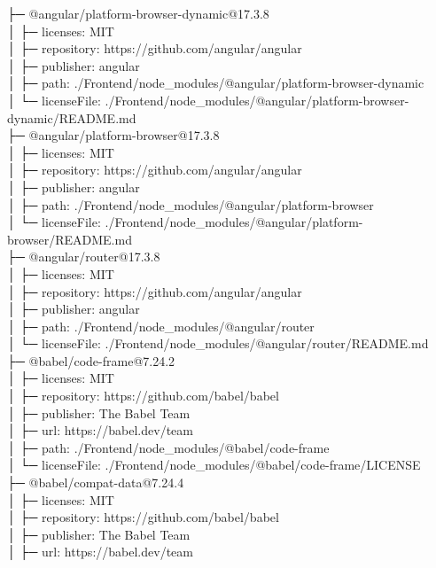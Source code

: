 \documentclass[
    paper=a4,
    twoside=false,
    parskip=half,
    listof=entryprefix,
    listof=totoc,
    index=totoc,
    bibliography=totoc,
    headsepline,
]{scrbook}
\begin{document}
    ├─ @angular/platform-browser-dynamic@17.3.8\\
    │  ├─ licenses: MIT\\
    │  ├─ repository: https://github.com/angular/angular\\
    │  ├─ publisher: angular\\
    │  ├─ path: ./Frontend/node\_modules/@angular/platform-browser-dynamic\\
    │  └─ licenseFile: ./Frontend/node\_modules/@angular/platform-browser-dynamic/README.md\\
    ├─ @angular/platform-browser@17.3.8\\
    │  ├─ licenses: MIT\\
    │  ├─ repository: https://github.com/angular/angular\\
    │  ├─ publisher: angular\\
    │  ├─ path: ./Frontend/node\_modules/@angular/platform-browser\\
    │  └─ licenseFile: ./Frontend/node\_modules/@angular/platform-browser/README.md\\
    ├─ @angular/router@17.3.8\\
    │  ├─ licenses: MIT\\
    │  ├─ repository: https://github.com/angular/angular\\
    │  ├─ publisher: angular\\
    │  ├─ path: ./Frontend/node\_modules/@angular/router\\
    │  └─ licenseFile: ./Frontend/node\_modules/@angular/router/README.md\\
    ├─ @babel/code-frame@7.24.2\\
    │  ├─ licenses: MIT\\
    │  ├─ repository: https://github.com/babel/babel\\
    │  ├─ publisher: The Babel Team\\
    │  ├─ url: https://babel.dev/team\\
    │  ├─ path: ./Frontend/node\_modules/@babel/code-frame\\
    │  └─ licenseFile: ./Frontend/node\_modules/@babel/code-frame/LICENSE\\
    ├─ @babel/compat-data@7.24.4\\
    │  ├─ licenses: MIT\\
    │  ├─ repository: https://github.com/babel/babel\\
    │  ├─ publisher: The Babel Team\\
    │  ├─ url: https://babel.dev/team\\
\end{document}
